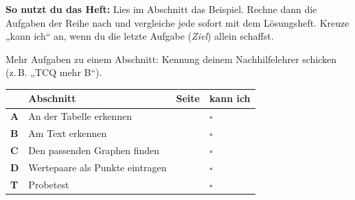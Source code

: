 \documentclass[11pt]{article}
\begin{document}
\par\smallskip
{}\par\medskip
\noindent\textbf{So nutzt du das Heft:} Lies im Abschnitt das Beispiel. Rechne dann die Aufgaben der Reihe nach und vergleiche jede sofort mit dem Lösungsheft. Kreuze „kann ich“ an, wenn du die letzte Aufgabe (\emph{Ziel}) allein schaffst.\par
\noindent Mehr Aufgaben zu einem Abschnitt: Kennung deinem Nachhilfelehrer schicken (z.\,B. „TCQ mehr B“).\par\medskip
{\renewcommand{\arraystretch}{1.3}
\noindent\begin{tabular}{|>{\bfseries}p{10mm}|p{112mm}|>{\raggedleft\arraybackslash}p{10mm}|>{\centering\arraybackslash}p{14mm}|}\hline
\rowcolor{black!8} & \textbf{Abschnitt} & \textbf{Seite} & \textbf{kann ich}\\\hline
A & An der Tabelle erkennen & \pageref{s:A} & $\square$\\\hline
B & Am Text erkennen & \pageref{s:B} & $\square$\\\hline
C & Den passenden Graphen finden & \pageref{s:C} & $\square$\\\hline
D & Wertepaare als Punkte eintragen & \pageref{s:D} & $\square$\\\hline
T & Probetest & \pageref{s:T} & $\square$\\\hline
\end{tabular}}\par\bigskip
\end{document}
